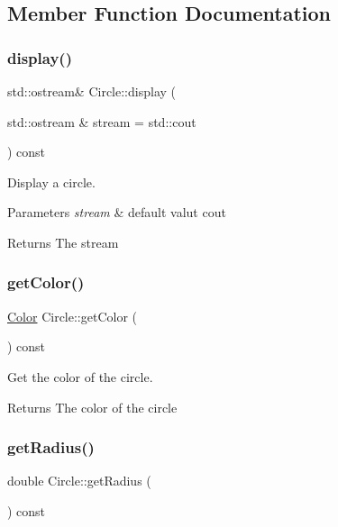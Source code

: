 \subsection{Member Function Documentation}
\mbox{\label{classCircle_ab8b37180fc8799e9422f659d4ab0a9da}} 
\subsubsection{\texorpdfstring{display()}{display()}}
{\footnotesize\ttfamily std\+::ostream\& Circle\+::display (\begin{DoxyParamCaption}\item[{std\+::ostream \&}]{stream = {\ttfamily std\+:\+:cout} }\end{DoxyParamCaption}) const}



Display a circle. 


\begin{DoxyParams}{Parameters}
{\em stream} & default valut cout \\
\hline
\end{DoxyParams}
\begin{DoxyReturn}{Returns}
The stream 
\end{DoxyReturn}
\mbox{\label{classCircle_a07a3c058df52ca4294103fd965490f12}} 
\subsubsection{\texorpdfstring{get\+Color()}{getColor()}}
{\footnotesize\ttfamily \hyperlink{classColor}{Color} Circle\+::get\+Color (\begin{DoxyParamCaption}{ }\end{DoxyParamCaption}) const}



Get the color of the circle. 

\begin{DoxyReturn}{Returns}
The color of the circle 
\end{DoxyReturn}
\mbox{\label{classCircle_a58eb59828b4459ca38932b87c65f03a9}} 
\subsubsection{\texorpdfstring{get\+Radius()}{getRadius()}}
{\footnotesize\ttfamily double Circle\+::get\+Radius (\begin{DoxyParamCaption}{ }\end{DoxyParamCaption}) const}



